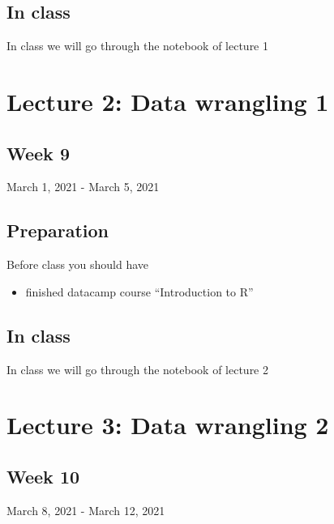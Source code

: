 \documentclass[
]{book}
\providecommand{\tightlist}{%
  \setlength{\itemsep}{0pt}\setlength{\parskip}{0pt}}
\begin{document}
\hypertarget{in-class}{%
\subsection{In class}\label{in-class}}

In class we will go through the notebook of lecture 1

\hypertarget{lecture-2-data-wrangling-1}{%
\section{Lecture 2: Data wrangling 1}\label{lecture-2-data-wrangling-1}}

\hypertarget{week-9}{%
\subsection{Week 9}\label{week-9}}

March 1, 2021 - March 5, 2021

\hypertarget{preparation-1}{%
\subsection{Preparation}\label{preparation-1}}

Before class you should have

\begin{itemize}
\tightlist
\item
  finished datacamp course ``Introduction to R''
\end{itemize}

\hypertarget{in-class-1}{%
\subsection{In class}\label{in-class-1}}

In class we will go through the notebook of lecture 2

\hypertarget{lecture-3-data-wrangling-2}{%
\section{Lecture 3: Data wrangling 2}\label{lecture-3-data-wrangling-2}}

\hypertarget{week-10}{%
\subsection{Week 10}\label{week-10}}

March 8, 2021 - March 12, 2021
\end{document}

